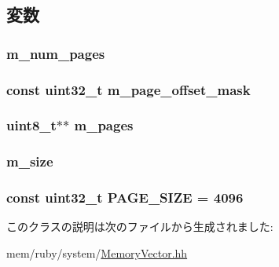 \subsection{変数}
\hypertarget{classMemoryVector_a388f518731020bfb575b5e4e6267fc5a}{
\subsubsection[{m\_\-num\_\-pages}]{ {\bf m\_\-num\_\-pages}}}
\label{classMemoryVector_a388f518731020bfb575b5e4e6267fc5a}
\hypertarget{classMemoryVector_a0db9bff4ff55b605292f796dd7aae285}{
\subsubsection[{m\_\-page\_\-offset\_\-mask}]{\setlength{\rightskip}{0pt plus 5cm}const {\bf uint32\_\-t} {\bf m\_\-page\_\-offset\_\-mask}}}
\label{classMemoryVector_a0db9bff4ff55b605292f796dd7aae285}
\hypertarget{classMemoryVector_a80e2fa6a21a7254c7956f4956a151faa}{
\subsubsection[{m\_\-pages}]{\setlength{\rightskip}{0pt plus 5cm}uint8\_\-t$\ast$$\ast$ {\bf m\_\-pages}}}
\label{classMemoryVector_a80e2fa6a21a7254c7956f4956a151faa}
\hypertarget{classMemoryVector_ac0071dd217f86f00bbd71d9d0d4eb257}{
\subsubsection[{m\_\-size}]{ {\bf m\_\-size}}}
\label{classMemoryVector_ac0071dd217f86f00bbd71d9d0d4eb257}
\hypertarget{classMemoryVector_adece9379840adc8842e99cea5f24e4f2}{
\subsubsection[{PAGE\_\-SIZE}]{\setlength{\rightskip}{0pt plus 5cm}const {\bf uint32\_\-t} {\bf PAGE\_\-SIZE} = 4096}}
\label{classMemoryVector_adece9379840adc8842e99cea5f24e4f2}


このクラスの説明は次のファイルから生成されました:\begin{DoxyCompactItemize}
\item 
mem/ruby/system/\hyperlink{MemoryVector_8hh}{MemoryVector.hh}\end{DoxyCompactItemize}
